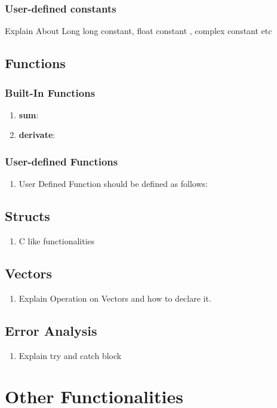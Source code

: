 \documentclass[12pt]{article}
\begin{document}
    \subsubsection{User-defined constants}
    Explain About Long long constant, float constant , complex constant etc
    \subsection{Functions}
    \subsubsection{Built-In Functions}
    \begin{enumerate}
        \item \textbf{sum}:
        \item \textbf{derivate}:
    \end{enumerate}
    \subsubsection{User-defined Functions}
    \begin{enumerate}
        \item User Defined Function should be defined as follows:
    \end{enumerate}
    \subsection{Structs}
    \begin{enumerate}
        \item C like functionalities
    \end{enumerate}
    \subsection{Vectors}
    \begin{enumerate}
        \item Explain Operation on Vectors and how to declare it.
    \end{enumerate}
    \subsection{Error Analysis}
    \begin{enumerate}
        \item Explain try and catch block
    \end{enumerate}
    
    \section{Other Functionalities}
\end{document}
